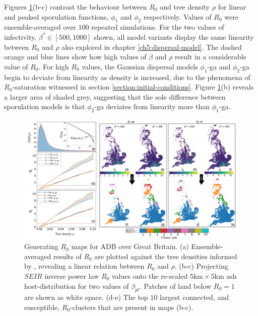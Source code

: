 Figures \ref{fig:R0-map-generation}(b-c) contrast the behaviour between $R_0$ and tree density $\rho$ for linear and peaked sporulation functions, $\phi_1$ and $\phi_2$ respectively.
Values of $R_0$ were ensemble-averaged over $100$ repeated simulations.
For the two values of infectivity, $\beta^*\in [500, 1000]$ shown, all model variants display the same linearity between $R_0$ and $\rho$ \textemdash also explored in chapter \ref{ch5:dispersal-model}.
The dashed orange and blue lines show how high values of $\beta$ and $\rho$ result in a considerable value of $R_0$.
For high $R_0$ values, the Gaussian dispersal models $\phi_1$-ga and $\phi_2$-ga begin to deviate from linearity as density is increased,
due to the phenomena of $R_0$-saturation witnessed in section \ref{section:initial-conditions}.
Figure \ref{fig:R0-map-generation}(b) reveals a larger area of shaded grey, 
suggesting that the sole difference between sporulation models is that $\phi_2$-ga deviates from linearity more than $\phi_1$-ga.

\begin{landscape}
\begin{figure}
    \centering
    \includegraphics[scale=0.38]{chapter6/figures/fig6-R0-map-generation.pdf}
    \caption{Generating $R_0$ maps for ADB over Great Britain. (a) Ensemble-averaged results of $R_0$ are plotted against the tree densities informed by \cite{hill.data}, revealing a linear relation between $R_0$ and $\rho$. (b-c) Projecting $SEIR$ inverse power law $R_0$ values onto the re-scaled $5\mathrm{km} \times 5 \mathrm{km}$ ash host-distribution for two values of $\beta_{pl}$. Patches of land below $R_0 = 1$ are shown as white space. (d-e) The top $10$ largest connected, and susceptible, $R_0$-clusters that are present in maps (b-c).}
    \label{fig:R0-map-generation}
\end{figure}
\end{landscape}

